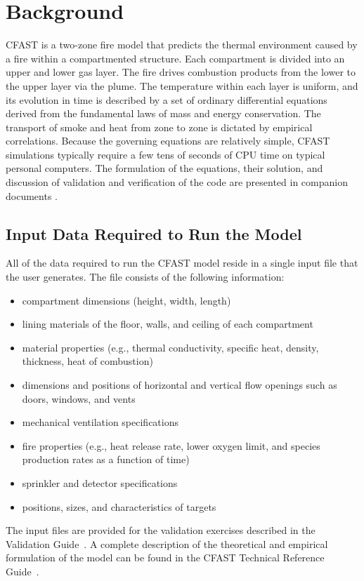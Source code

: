 
\chapter{Background}

CFAST is a two-zone fire model that predicts the thermal environment caused by a fire within a compartmented structure. Each compartment is divided into an upper and lower gas layer. The fire drives combustion products from the lower to the upper layer via the plume. The temperature within each layer is uniform, and its evolution in time is described by a set of ordinary differential equations derived from the fundamental laws of mass and energy conservation. The transport of smoke and heat from zone to zone is dictated by empirical correlations. Because the governing equations are relatively simple, CFAST simulations typically require a few tens of seconds of CPU time on typical personal computers.  The formulation of the equations, their solution, and discussion of validation and verification of the code are presented in companion documents \cite{CFAST_Tech_Guide_7, CFAST_Valid_Guide_7}.


\section{Input Data Required to Run the Model}

All of the data required to run the CFAST model reside in a single input file that the user generates. The file consists of the following information:
\begin{itemize}
\item compartment dimensions (height, width, length)
\item lining materials of the floor, walls, and ceiling of each compartment
\item material properties (e.g., thermal conductivity, specific heat, density, thickness, heat of combustion)
\item dimensions and positions of horizontal and vertical flow openings such as doors, windows, and vents
\item mechanical ventilation specifications
\item fire properties (e.g., heat release rate, lower oxygen limit, and species production rates as a function of time)
\item sprinkler and detector specifications
\item positions, sizes, and characteristics of targets
\end{itemize}
The input files are provided for the validation exercises described in the Validation Guide~\cite{CFAST_Valid_Guide_7}. A complete description of the theoretical and empirical formulation of the model can be found in the CFAST Technical Reference Guide~\cite{CFAST_Tech_Guide_7}.

